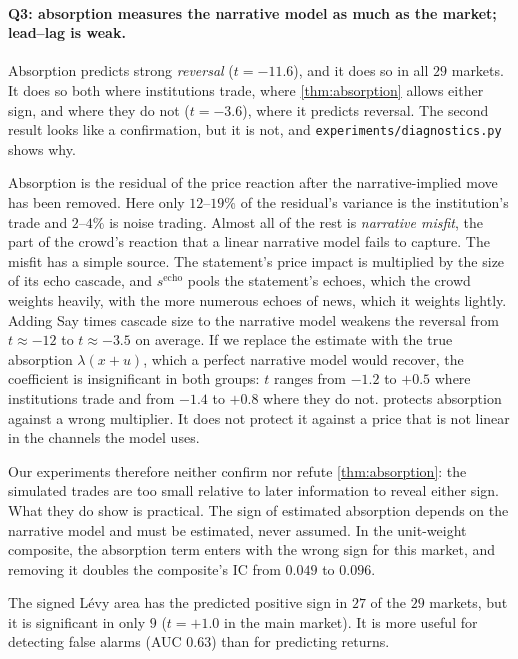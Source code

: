 \documentclass{article}
\theoremstyle{plain}
\theoremstyle{definition}
\theoremstyle{remark}
\begin{document}
\paragraph{Q3: absorption measures the narrative model as much as the market; lead--lag is weak.} Absorption predicts strong \emph{reversal} ($t=-11.6$), and it does so in all $29$ markets. It does so both where institutions trade, where \cref{thm:absorption} allows either sign, and where they do not ($t=-3.6$), where it predicts reversal. The second result looks like a confirmation, but it is not, and \texttt{experiments/diagnostics.py} shows why.

Absorption is the residual of the price reaction after the narrative-implied move has been removed. Here only $12$--$19\%$ of the residual's variance is the institution's trade and $2$--$4\%$ is noise trading. Almost all of the rest is \emph{narrative misfit}, the part of the crowd's reaction that a linear narrative model fails to capture. The misfit has a simple source. The statement's price impact is multiplied by the size of its echo cascade, and $s^{\text{echo}}$ pools the statement's echoes, which the crowd weights heavily, with the more numerous echoes of news, which it weights lightly. Adding Say times cascade size to the narrative model weakens the reversal from $t\approx-12$ to $t\approx-3.5$ on average. If we replace the estimate with the true absorption $\lambda(x+u)$, which a perfect narrative model would recover, the coefficient is insignificant in both groups: $t$ ranges from $-1.2$ to $+0.5$ where institutions trade and from $-1.4$ to $+0.8$ where they do not.  protects absorption against a wrong multiplier. It does not protect it against a price that is not linear in the channels the model uses.

Our experiments therefore neither confirm nor refute \cref{thm:absorption}: the simulated trades are too small relative to later information to reveal either sign. What they do show is practical. The sign of estimated absorption depends on the narrative model and must be estimated, never assumed. In the unit-weight composite, the absorption term enters with the wrong sign for this market, and removing it doubles the composite's IC from $0.049$ to $0.096$.

The signed L\'evy area has the predicted positive sign in $27$ of the $29$ markets, but it is significant in only $9$ ($t=+1.0$ in the main market). It is more useful for detecting false alarms (AUC $0.63$) than for predicting returns.
\end{document}

